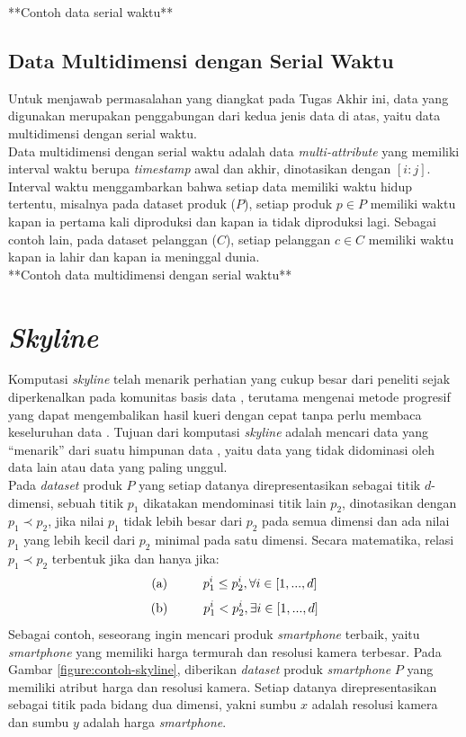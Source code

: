 **Contoh data serial waktu**

\subsection{Data Multidimensi dengan Serial Waktu}
\tab Untuk menjawab permasalahan yang diangkat pada Tugas Akhir ini, data yang digunakan merupakan penggabungan dari kedua jenis data di atas, yaitu data multidimensi dengan serial waktu.\\
\tab Data multidimensi dengan serial waktu adalah data \textit{multi-attribute} yang memiliki interval waktu berupa \textit{timestamp} awal dan akhir, dinotasikan dengan $[i:j]$. Interval waktu menggambarkan bahwa setiap data memiliki waktu hidup tertentu, misalnya pada dataset produk ($P$), setiap produk $p \in P$ memiliki waktu kapan ia pertama kali diproduksi dan kapan ia tidak diproduksi lagi. Sebagai contoh lain, pada dataset pelanggan ($C$), setiap pelanggan $c \in C$ memiliki waktu kapan ia lahir dan kapan ia meninggal dunia.\\

**Contoh data multidimensi dengan serial waktu**

\section{\textit{Skyline}}
\tab Komputasi \textit{skyline} telah menarik perhatian yang cukup besar dari peneliti sejak diperkenalkan pada komunitas basis data \cite{skyline}, terutama mengenai metode progresif yang dapat mengembalikan hasil kueri dengan cepat tanpa perlu membaca keseluruhan data \cite{dynamic-skyline}. Tujuan dari komputasi \textit{skyline} adalah mencari data yang “menarik” dari suatu himpunan data \cite{skyline}, yaitu data yang tidak didominasi oleh data lain atau data yang paling unggul.\\
\tab Pada \textit{dataset} produk $P$ yang setiap datanya direpresentasikan sebagai titik $d$-dimensi, sebuah titik $p_1$ dikatakan mendominasi titik lain $p_2$, dinotasikan dengan  $p_1 \prec p_2$, jika nilai $p_1$ tidak lebih besar dari $p_2$ pada semua dimensi dan ada nilai $p_1$ yang lebih kecil dari $p_2$ minimal pada satu dimensi. Secara matematika, relasi $p_1 \prec p_2$ terbentuk jika dan hanya jika:
\[\text{(a)} \hspace*{1cm} p_1^i \leq p_2^i, \forall i \in [1, ..., d]\] 
\[\text{(b)} \hspace*{1cm} p_1^i < p_2^i, \exists i \in [1, ..., d]\]
\tab Sebagai contoh, seseorang ingin mencari produk \textit{smartphone} terbaik, yaitu \textit{smartphone} yang memiliki harga termurah dan resolusi kamera terbesar. Pada Gambar \ref{figure:contoh-skyline}, diberikan \textit{dataset} produk \textit{smartphone} $P$ yang memiliki atribut harga dan resolusi kamera. Setiap datanya direpresentasikan sebagai titik pada bidang dua dimensi, yakni sumbu $x$ adalah resolusi kamera dan sumbu $y$ adalah harga \textit{smartphone}.\\

